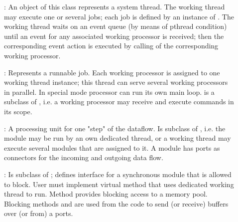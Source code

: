 \begin{description}
\item[] :  
An object of this class represents a system thread. 
   The working thread may execute one or several jobs; each job is defined 
   by an instance of . The working thread waits on an 
   event queue (by means of pthread condition) until an event for any 
   associated working processor is received; then the corresponding event action is 
   executed by calling  of the corresponding working processor.

\item[] :   
   Represents a runnable job. Each 
   working processor is assigned to one working thread instance; 
   this thread can serve several working processors in parallel.
   In special mode processor can run its own main loop.  
    is a subclass of , 
   i.e. a working processor may receive and execute commands in its scope. 

\item[] :  
A processing unit for one "step" of the dataflow. 
   Is subclass of , i.e. the module may be run by an own 
   dedicated thread, or a working thread may execute several modules that 
   are assigned to it. A module has ports as connectors for the 
   incoming and outgoing data flow.   

\item[] : 
Is subclass of ; defines interface for a 
   synchronous module that is allowed to block. User must implement virtual 
   method  that uses dedicated working thread to run. 
   Method  provides blocking access to a memory pool. 
   Blocking methods  and
     are used from the  
    code to send (or receive) buffers over (or from) a ports.  


\end{description}
